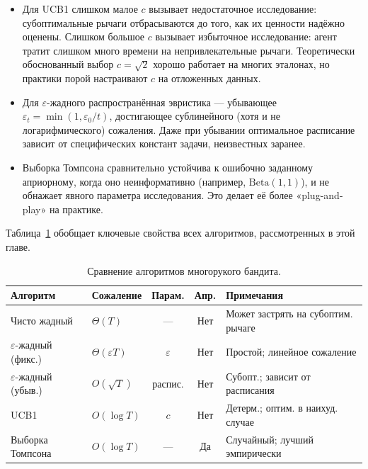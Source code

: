 \begin{itemize}[leftmargin=*]
\item Для UCB1 слишком малое $c$ вызывает недостаточное исследование: субоптимальные рычаги отбрасываются до того, как их ценности надёжно оценены.  Слишком большое $c$ вызывает избыточное исследование: агент тратит слишком много времени на непривлекательные рычаги.  Теоретически обоснованный выбор $c=\sqrt{2}$ хорошо работает на многих эталонах, но практики порой настраивают $c$ на отложенных данных.
\item Для $\varepsilon$-жадного распространённая эвристика — убывающее $\varepsilon_t = \min(1, \varepsilon_0/t)$, достигающее сублинейного (хотя и не логарифмического) сожаления.  Даже при убывании оптимальное расписание зависит от специфических констант задачи, неизвестных заранее.
\item Выборка Томпсона сравнительно устойчива к ошибочно заданному априорному, когда оно неинформативно (например, $\mathrm{Beta}(1,1)$), и не обнажает явного параметра исследования.  Это делает её более «plug-and-play» на практике.
\end{itemize}

Таблица~\ref{tab:comparison} обобщает ключевые свойства всех алгоритмов, рассмотренных в этой главе.

\begin{table}[ht]
\centering
\caption{Сравнение алгоритмов многорукого бандита.}
\label{tab:comparison}
\footnotesize
\begin{tabular}{@{}llccp{3.5cm}@{}}
\toprule
Алгоритм & Сожаление & Парам. & Апр. & Примечания \\
\midrule
Чисто жадный      & $\Theta(T)$         & ---            & Нет  & Может застрять на субоптим. рычаге \\
$\varepsilon$-жадный (фикс.) & $\Theta(\varepsilon T)$ & $\varepsilon$ & Нет & Простой; линейное сожаление \\
$\varepsilon$-жадный (убыв.) & $O(\sqrt{T})$  & распис. & Нет & Субопт.; зависит от расписания \\
UCB1             & $O(\log T)$         & $c$            & Нет  & Детерм.; оптим. в наихуд. случае \\
Выборка Томпсона & $O(\log T)$        & ---            & Да & Случайный; лучший эмпирически \\
\bottomrule
\end{tabular}
\end{table}


